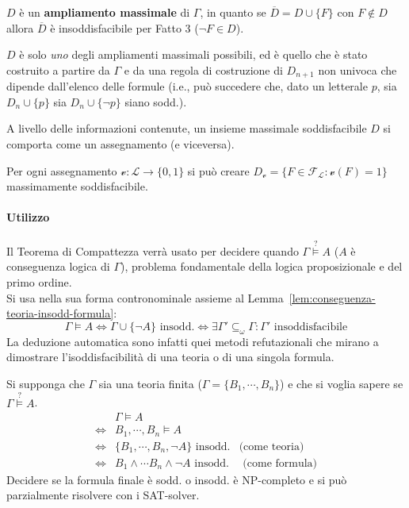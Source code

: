 \begin{ossn}
$D$ è un \textbf{ampliamento massimale} di $\Gamma$, in quanto se $\overline{D} = D \cup \{F\}$ con $F \notin D$ allora $\overline D$ è insoddisfacibile per Fatto 3 ($\neg F \in D$).
\end{ossn}
$D$ è solo \textit{uno} degli ampliamenti massimali possibili, ed è quello che è stato 
costruito a partire da $\Gamma$ e da una regola di costruzione di $D_{n+1}$ non univoca che dipende dall'elenco delle formule (i.e., può succedere che, dato un letterale $p$, sia $D_n \cup \{p\}$ sia $D_n \cup \{\neg p\}$ siano sodd.).

\begin{ossn}
A livello delle informazioni contenute, un insieme massimale soddisfacibile $D$ si comporta come un assegnamento (e viceversa).
\end{ossn}
Per ogni assegnamento $\mathcal{v} : \mathscr{L} \rightarrow \{0,1\}$ si può creare $D_\mathcal{v} = \{ F \in \mathscr{F_L} : \mathcal{v}(F) = 1\}$ massimamente soddisfacibile.

\paragraph{Utilizzo}
Il Teorema di Compattezza verrà usato per decidere quando $\Gamma \stackrel{?}{\models} A$ ($A$ è conseguenza logica di $\Gamma$), problema fondamentale della logica proposizionale e del primo ordine.\\
Si usa nella sua forma contronominale assieme al Lemma~\ref{lem:conseguenza-teoria-insodd-formula}:
$$
\Gamma \models A \iff \Gamma \cup \{\neg A \} \text{ insodd.} \iff \exists \Gamma' \subseteq_{\omega} \Gamma : \Gamma' \text{ insoddisfacibile}
$$
La deduzione automatica sono infatti quei metodi refutazionali che mirano a dimostrare l'isoddisfacibilità di una teoria o di una singola formula.

Si supponga che $\Gamma$ sia una teoria finita ($\Gamma = \{B_1, \cdots, B_n\}$) e che si voglia sapere se $\Gamma \stackrel{?}{\models} A$.
\begin{align*}
  & \Gamma \models A \\
  \iff & B_1, \cdots, B_n \models A \\
  \iff & \{B_1, \cdots,B_n,\neg A\} \text{ insodd.} & \text{(come teoria)}\\
  \iff & B_1 \land \cdots B_n \land \neg A \text{ insodd.} & \text{ (come formula)}
\end{align*}
Decidere se la formula finale è sodd. o insodd. è NP-completo e si può parzialmente risolvere con i SAT-solver.

